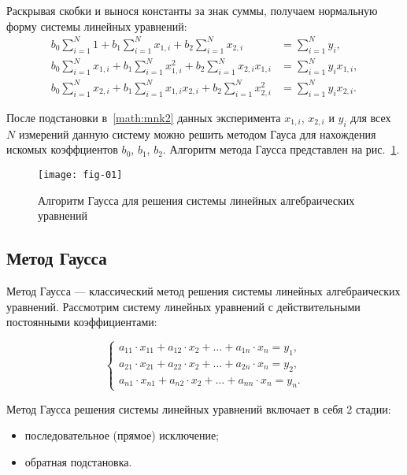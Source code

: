 Раскрывая скобки и вынося константы за знак суммы, получаем нормальную форму системы линейных уравнений:
\begin{equation}
    \begin{aligned}
        b_0 \sum_{i=1}^{N}{1}       +  b_1 \sum_{i=1}^{N}{x_{1,i}}        + b_2 \sum_{i=1}^{N}{x_{2,i}}         & = \sum_{i=1}^{N}{y_i},            \\[1em]
        b_0 \sum_{i=1}^{N}{x_{1,i}} +  b_1 \sum_{i=1}^{N} x_{1,i}^2       + b_2 \sum_{i=1}^{N}{x_{2,i} x_{1,i}} & = \sum_{i=1}^{N} {y_i x_{1,i}},   \\[1em]
        b_0 \sum_{i=1}^{N}{x_{2,i}} +  b_1 \sum_{i=1}^{N}{x_{1,i}x_{2,i}} + b_2\sum_{i=1}^{N}{x_{2,i}^2}        & = \sum_{i=1}^{N}{y_i x_{2,i}}.
    \end{aligned}
    \label{math:mnk2}
\end{equation}

После подстановки в~\ref{math:mnk2} данных эксперимента $x_{1,i}$, $x_{2,i}$ и $y_i$ для всех $N$ измерений данную систему можно решить методом Гауса для нахождения искомых коэффциентов $b_0$, $b_1$, $b_2$. Алгоритм метода Гаусса представлен на рис.~\ref{fig:Gauss}.

\begin{figure}[h!]
    \centering
    \texttt{[image: fig-01]}
    \caption{Алгоритм Гаусса для решения системы линейных алгебраических уравнений}
    \label{fig:Gauss}
\end{figure}


\subsection{Метод Гаусса}
Метод Гаусса — классический метод решения системы линейных алгебраических уравнений. Рассмотрим систему линейных уравнений с действительными постоянными коэффициентами:

\begin{equation}
    \begin{cases}
        a_{11} \cdot x_{11} + a_{12} \cdot x_2 + \dots + a_{1n} \cdot x_n = y_1,
        \\
        a_{21} \cdot x_{21} + a_{22} \cdot x_2 + \dots + a_{2n} \cdot x_n = y_2,
        \\[0.5em]
        a_{n1} \cdot x_{n1} + a_{n2} \cdot x_2 + \dots + a_{nn} \cdot x_n = y_n.
     \end{cases}
\end{equation}

Метод Гаусса решения системы линейных уравнений включает в себя 2 стадии:
\begin{itemize}
    \item{последовательное (прямое) исключение;}
    \item{обратная подстановка.}
\end{itemize}

